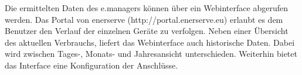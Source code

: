  \noindent
 Die ermittelten Daten des e.managers können über ein Webinterface abgerufen werden. Das Portal von enerserve (http://portal.enerserve.eu) erlaubt es dem Benutzer den Verlauf der einzelnen Geräte zu verfolgen. Neben einer Übersicht des aktuellen Verbrauchs, liefert das Webinterface auch historische Daten. Dabei wird zwischen Tages-, Monats- und Jahresansicht unterschieden. Weiterhin bietet das Interface eine Konfiguration der Anschlüsse.